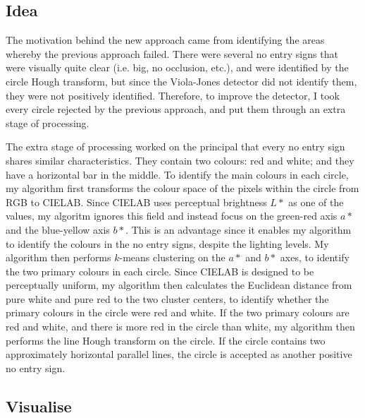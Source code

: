 \documentclass[twocolumn, 10pt, a4paper]{article}
\begin{document}
\subsection{Idea}

The motivation behind the new approach came from identifying the areas whereby the previous approach failed.
There were several no entry signs that were visually quite clear (i.e. big, no occlusion, etc.), and were identified by the circle Hough transform, but since the Viola-Jones detector did not identify them, they were not positively identified.
Therefore, to improve the detector, I took every circle rejected by the previous approach, and put them through an extra stage of processing.

The extra stage of processing worked on the principal that every no entry sign shares similar characteristics.
They contain two colours: red and white; and they have a horizontal bar in the middle.
To identify the main colours in each circle, my algorithm first transforms the colour space of the pixels within the circle from RGB to CIELAB.
Since CIELAB uses perceptual brightness $L*$ as one of the values, my algoritm ignores this field and instead focus on the green-red axis $a*$ and the blue-yellow axis $b*$.
This is an advantage since it enables my algorithm to identify the colours in the no entry signs, despite the lighting levels.
My algorithm then performs $k$-means clustering on the $a*$ and $b*$ axes, to identify the two primary colours in each circle.
Since CIELAB is designed to be perceptually uniform, my algorithm then calculates the Euclidean distance from pure white and pure red to the two cluster centers, to identify whether the primary colours in the circle were red and white.
If the two primary colours are red and white, and there is more red in the circle than white, my algorithm then performs the line Hough transform on the circle.
If the circle contains two approximately horizontal parallel lines, the circle is accepted as another positive no entry sign.

\subsection{Visualise}
\end{document}
